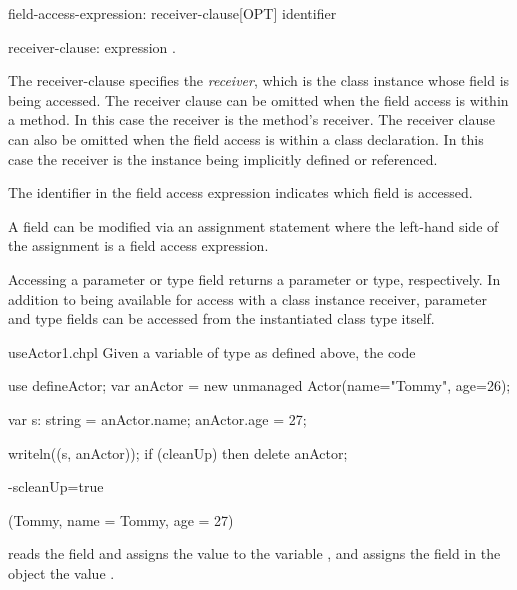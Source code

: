 \begin{syntax}
field-access-expression:
  receiver-clause[OPT] identifier

receiver-clause:
  expression .
\end{syntax}

The receiver-clause specifies the \emph{receiver}, which is the class
instance whose field is being accessed.
The receiver clause can be omitted when the field access is within a method.
In this case the receiver is the method's receiver.
The receiver clause can also be omitted when the field access is within
a class declaration. In this case the receiver is the instance
being implicitly defined or referenced.

The identifier in the field access expression indicates which field is accessed.


A field can
be modified via an assignment statement where the left-hand side of
the assignment is a field access expression.

Accessing a parameter or type field returns a parameter or type,
respectively. In addition to being available for access with a class
instance receiver, parameter and type fields can be accessed from the
instantiated class type itself.

\begin{chapelexample}{useActor1.chpl}
Given a variable  of type  as defined above,
the code
\begin{chapelpre}
use defineActor;
var anActor = new unmanaged Actor(name="Tommy", age=26);
\end{chapelpre}
\begin{chapel}
var s: string = anActor.name;
anActor.age = 27;
\end{chapel}
\begin{chapelpost}
writeln((s, anActor));
if (cleanUp) then delete anActor;
\end{chapelpost}
\begin{chapelcompopts}
-scleanUp=true
\end{chapelcompopts}
\begin{chapeloutput}
(Tommy, {name = Tommy, age = 27})
\end{chapeloutput}
reads the field  and assigns the value to the variable
, and assigns the field  in the object
 the value .
\end{chapelexample}

